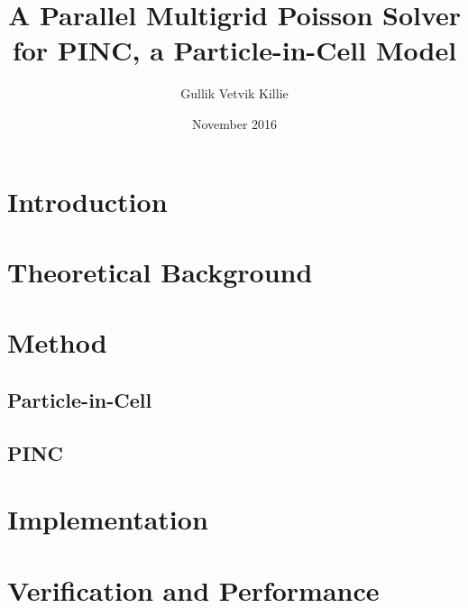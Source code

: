 \documentclass[x11names,twoside,english]{uiofysmaster}
\author{Gullik Vetvik Killie}
\title{A Parallel Multigrid Poisson Solver for PINC, a Particle-in-Cell Model}
\date{November 2016}
\begin{document}
\maketitle



%
\tableofcontents

\chapter{Introduction}
    

\chapter{Theoretical Background}
	\label{sec:theory}
    
    
    
    
    
    
    
%
\chapter{Method}
	\label{sec:Method}
    
	\section{Particle-in-Cell}
    
    
	\section{PINC}
	
    
    
    
    
    

\chapter{Implementation}
	\label{sec:impl}
    
    
    
    

\chapter{Verification and Performance}
	\label{sec:ver_perf}
\end{document}
